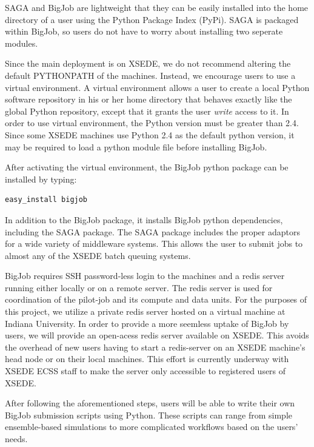 \documentclass{sig-alternate}
\begin{document}
SAGA and BigJob are lightweight that they can be easily installed into
the home directory of a user using the Python Package Index
(PyPi). SAGA is packaged within BigJob, so users do not have to worry
about installing two seperate modules.

Since the main deployment is on XSEDE, we do not recommend altering
the default PYTHONPATH of the machines. Instead, we encourage users to
use a virtual environment. A virtual environment allows a user to
create a local Python software repository in his or her home directory
that behaves exactly like the global Python repository, except that it
grants the user \textit{write} access to it. In order to use virtual
environment, the Python version must be greater than 2.4. Since some
XSEDE machines use Python 2.4 as the default python version, it may be
required to load a python module file before installing BigJob.

After activating the virtual environment, the BigJob python package
can be installed by typing:

\begin{lstlisting}[frame=single]
easy_install bigjob
\end{lstlisting}

In addition to the BigJob package, it installs BigJob python
dependencies, including the SAGA package. The SAGA package includes
the proper adaptors for a wide variety of middleware systems. This
allows the user to submit jobs to almost any of the XSEDE batch
queuing systems.

BigJob requires SSH password-less login to the machines and a redis
server running either locally or on a remote server. The redis server
is used for coordination of the pilot-job and its compute and data
units. For the purposes of this project, we utilize a private redis
server hosted on a virtual machine at Indiana University. In order to
provide a more seemless uptake of BigJob by users, we will provide an
open-acess redis server available on XSEDE. This avoids the overhead
of new users having to start a redis-server on an XSEDE machine's head
node or on their local machines. This effort is currently underway
with XSEDE ECSS staff to make the server only accessible to registered
users of XSEDE.

After following the aforementioned steps, users will be able to write
their own BigJob submission scripts using Python. These scripts can
range from simple ensemble-based simulations to more complicated
workflows based on the users' needs.
\end{document}

